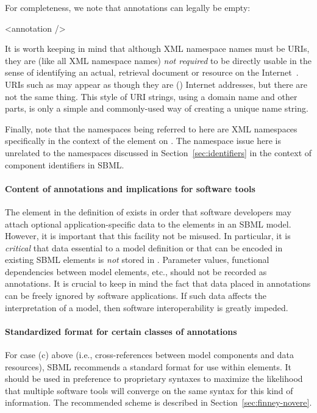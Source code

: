 For completeness, we note that annotations can legally be empty:

\begin{example}
<annotation />
\end{example}

It is worth keeping in mind that although XML namespace names must
be URIs, they are (like all XML namespace names) \emph{not
  required} to be directly usable in the sense of identifying an
actual, retrieval document or resource on the
Internet~\citep{bray:1999}.  URIs such as
 may appear as though they are (\eg)
Internet addresses, but there are not the same thing.  This style
of URI strings, using a domain name and other parts, is only a
simple and commonly-used way of creating a unique name string.

Finally, note that the namespaces being referred to here are XML
namespaces specifically in the context of the 
element on \SBase.  The namespace issue here is unrelated to the
namespaces discussed in Section~\ref{sec:identifiers} in the
context of component identifiers in SBML.


\paragraph{Content of annotations and implications for software tools}

The  element in the definition of \SBase exists in
order that software developers may attach optional
application-specific data to the elements in an SBML model.
However, it is important that this facility not be misused.  In
particular, it is \emph{critical} that data essential to a model
definition or that can be encoded in existing SBML elements is
\emph{not} stored in . Parameter values,
functional dependencies between model elements, etc., should not
be recorded as annotations.  It is crucial to keep in mind the
fact that data placed in annotations can be freely ignored by
software applications.  If such data affects the interpretation of
a model, then software interoperability is greatly impeded.


\paragraph{Standardized format for certain classes of annotations}

For case (c) above (i.e., cross-references between model
components and data resources), SBML \thisLV recommends a
standard format for use within 
elements.  It should be used in preference to
proprietary syntaxes to maximize the likelihood that multiple
software tools will converge on the same syntax for this kind of
information.  The recommended scheme is described in
Section~\ref{sec:finney-novere}.



